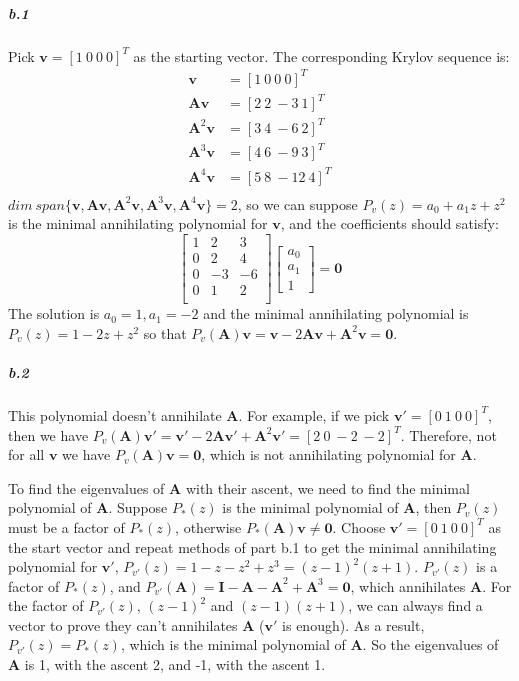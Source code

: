 \documentclass[22pt]{article}
\begin{document}
	 \subparagraph{b.1} Pick $\mathbf{v} = [1\ 0\ 0\ 0]^T$ as the starting vector. The corresponding Krylov sequence is:
		\begin{align}
			\mathbf{v} & = [1\ 0\ 0\ 0]^T\\
			\mathbf{Av} & = [2\ 2\ -3\ 1]^T\\
			\mathbf{A}^2\mathbf{v} & = [3\ 4\ -6\ 2]^T\\
			\mathbf{A}^3\mathbf{v} & = [4\ 6\ -9\ 3]^T\\
			\mathbf{A}^4\mathbf{v} & = [5\ 8\ -12\ 4]^T\\
		\end{align}
	$dim\ span\{\mathbf{v},\mathbf{Av},\mathbf{A}^2\mathbf{v},\mathbf{A}^3\mathbf{v},\mathbf{A}^4\mathbf{v}\} = 2$, so we can suppose $P_v(z) = a_0+a_1z+z^2$ is the minimal annihilating polynomial for $\mathbf{v}$, and the coefficients should satisfy:
	\begin{equation}
		\left[\begin{array}{ccc} 1&2&3\\ 0&2&4\\ 0&-3&-6 \\0&1&2\\  \end{array}\right] \left[\begin{array}{c} a_0 \\ a_1\\1 \end{array}\right] = \mathbf{0 }
	\end{equation}
	The solution is $a_0=1,a_1=-2$ and the minimal annihilating polynomial is $P_v(z) = 1-2z+z^2$ so that $P_v(\mathbf{A})\mathbf{v} = \mathbf{v}-2\mathbf{Av}+\mathbf{A}^2\mathbf{v=0}$.\\[1ex]

	\subparagraph{b.2} This polynomial doesn't annihilate $\mathbf{A}$. For example, if we pick $\mathbf{v'} = [0\ 1\ 0\ 0]^T$, then we have  $P_v(\mathbf{A})\mathbf{v'} = \mathbf{v'}-2\mathbf{Av'}+\mathbf{A}^2\mathbf{v'} = [2\ 0\ -2\ -2]^T$. Therefore, not for all $\mathbf{v}$ we have $P_v(\mathbf{A})\mathbf{v}=\mathbf{0}$, which is not annihilating polynomial for $\mathbf{A}$.

	To find the eigenvalues of $\mathbf{A}$ with their ascent, we need to find the minimal polynomial of $\mathbf{A}$. Suppose $P_*(z)$ is  the minimal polynomial of $\mathbf{A}$, then $P_v(z)$ must be a factor of $P_*(z)$, otherwise $P_*(\mathbf{A})\mathbf{v} \not= \mathbf{0}$. Choose $\mathbf{v'} = [0\ 1\ 0\ 0]^T$ as the start vector and repeat methods of part b.1 to get the minimal annihilating polynomial for $\mathbf{v'}$, $P_{v'}(z) = 1-z-z^2+z^3 = (z-1)^2(z+1)$. $P_{v'}(z)$ is a factor of $P_*(z)$, and $P_{v'}(\mathbf{A}) = \mathbf{I -A-A}^2+\mathbf{A}^3=\mathbf{0}$, which annihilates $\mathbf{A}$. For the factor of $P_{v'}(z)$, $(z-1)^2$ and $(z-1)(z+1)$, we can always find a vector to prove they can't annihilates $\mathbf{A}$ ($\mathbf{v'}$ is enough). As a result, $P_{v'}(z) = P_*(z)$, which is the minimal polynomial of $\mathbf{A}$. So the eigenvalues of $\mathbf{A}$ is 1, with the ascent 2, and -1, with the ascent 1.
\end{document}
